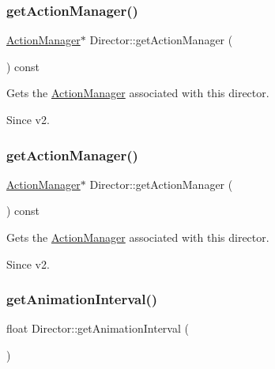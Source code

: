 \subsubsection{\texorpdfstring{get\+Action\+Manager()}{getActionManager()}\hspace{0.1cm}{\footnotesize\ttfamily [1/2]}}
{\footnotesize\ttfamily \hyperlink{classActionManager}{Action\+Manager}$\ast$ Director\+::get\+Action\+Manager (\begin{DoxyParamCaption}{ }\end{DoxyParamCaption}) const\hspace{0.3cm}{\ttfamily [inline]}}

Gets the \hyperlink{classActionManager}{Action\+Manager} associated with this director. \begin{DoxySince}{Since}
v2. 
\end{DoxySince}
\mbox{\label{classDirector_aecb253e4de577ebd009367f27d2a07de}} 
\subsubsection{\texorpdfstring{get\+Action\+Manager()}{getActionManager()}\hspace{0.1cm}{\footnotesize\ttfamily [2/2]}}
{\footnotesize\ttfamily \hyperlink{classActionManager}{Action\+Manager}$\ast$ Director\+::get\+Action\+Manager (\begin{DoxyParamCaption}{ }\end{DoxyParamCaption}) const\hspace{0.3cm}{\ttfamily [inline]}}

Gets the \hyperlink{classActionManager}{Action\+Manager} associated with this director. \begin{DoxySince}{Since}
v2. 
\end{DoxySince}
\mbox{\label{classDirector_ad69cc0f9296b7e083f1e91b3a84dad94}} 
\subsubsection{\texorpdfstring{get\+Animation\+Interval()}{getAnimationInterval()}\hspace{0.1cm}{\footnotesize\ttfamily [1/2]}}
{\footnotesize\ttfamily float Director\+::get\+Animation\+Interval (\begin{DoxyParamCaption}{ }\end{DoxyParamCaption})\hspace{0.3cm}{\ttfamily [inline]}}

